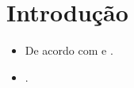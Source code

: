 \chapter{Introdução}

\begin{itemize}
	\item De acordo com  e .
	\item \cite{VonBlanckenburg2012a, Lantz2013}.
\end{itemize}
